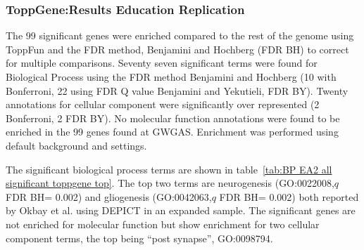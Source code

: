 





\subsubsection{ToppGene:Results Education Replication}

The 99 significant genes were enriched compared to the rest of the genome  using ToppFun and the FDR method, Benjamini and Hochberg (FDR BH) to correct for multiple comparisons. Seventy seven significant terms were found for Biological Process using the FDR method Benjamini and Hochberg (10 with Bonferroni, 22 using FDR Q value Benjamini and Yekutieli, FDR BY). Twenty annotations for cellular component were significantly over represented (2 Bonferroni, 2 FDR BY). No molecular function annotations were found to be enriched in the 99 genes found at GWGAS. Enrichment was performed using default background and settings. 


The significant biological process terms are shown in  table~\ref{tab:BP EA2 all significant toppgene top}. The top two terms are neurogenesis (GO:0022008,$q$ FDR BH= 0.002) and gliogenesis (GO:0042063,$q$ FDR BH= 0.002) both reported by Okbay et al. using DEPICT in an expanded sample\cite{okbay2016genome}. The significant genes are not enriched for molecular function but show enrichment for two cellular component terms, the top being ``post synapse'', GO:0098794.

